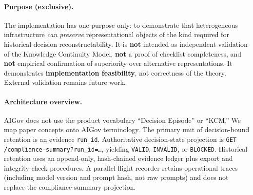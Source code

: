 \documentclass[11pt,a4paper]{article}
\begin{document}
\paragraph{Purpose (exclusive).}
The implementation has one purpose only: to demonstrate that heterogeneous infrastructure \emph{can preserve} representational objects of the kind required for historical decision reconstructability. It is \textbf{not} intended as independent validation of the Knowledge Continuity Model, \textbf{not} a proof of checklist completeness, and \textbf{not} empirical confirmation of superiority over alternative representations. It demonstrates \textbf{implementation feasibility}, not correctness of the theory. External validation remains future work.

\paragraph{Architecture overview.}
AIGov does not use the product vocabulary ``Decision Episode'' or ``KCM.'' We map paper concepts onto AIGov terminology. The primary unit of decision-bound retention is an evidence \texttt{run\_id}. Authoritative decision-state projection is \texttt{GET /compliance-summary?run\_id=\ldots}, yielding \texttt{VALID}, \texttt{INVALID}, or \texttt{BLOCKED}. Historical retention uses an append-only, hash-chained evidence ledger plus export and integrity-check procedures. A parallel flight recorder retains operational traces (including model version and prompt hash, not raw prompts) and does not replace the compliance-summary projection.
\end{document}
